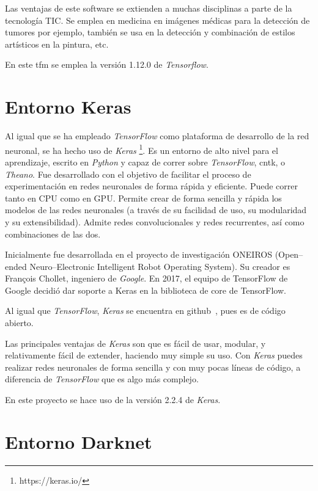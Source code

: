 Las ventajas de este software se extienden a muchas disciplinas a parte de la tecnología TIC. Se emplea en medicina en imágenes médicas para la detección de tumores por ejemplo, también se usa en la detección y combinación de estilos artísticos en la pintura, etc.

En este \acrshort{tfm} se emplea la versión 1.12.0 de \textit{Tensorflow}.

\section{Entorno Keras}

Al igual que se ha empleado \textit{TensorFlow} como plataforma de desarrollo de la red neuronal, se ha hecho uso de \textit{Keras} \footnote{https://keras.io/}. Es un entorno de alto nivel para el aprendizaje, escrito en \textit{Python} y capaz de correr sobre \textit{TensorFlow}, \acrshort{cntk}, o \textit{Theano}. Fue desarrollado con el objetivo de facilitar el proceso de experimentación en redes neuronales de forma rápida y eficiente. Puede correr tanto en CPU como en GPU. Permite crear de forma sencilla y rápida los modelos de las redes neuronales (a través de su facilidad de uso, su modularidad y su extensibilidad). Admite redes convolucionales y redes recurrentes, así como combinaciones de las dos.

Inicialmente fue desarrollada en el proyecto de investigación ONEIROS (Open--ended Neuro--Electronic Intelligent Robot Operating System). Su creador es Fran\c{c}ois Chollet, ingeniero de \textit{Google}.
En 2017, el equipo de TensorFlow de Google decidió dar soporte a Keras en la biblioteca de core de TensorFlow.

Al igual que \textit{TensorFlow}, \textit{Keras} se encuentra en github~\cite{keras_github}, pues es de código abierto. 

Las principales ventajas de \textit{Keras} son que es fácil de usar, modular, y relativamente fácil de extender, haciendo muy simple su uso. Con \textit{Keras} puedes realizar redes neuronales de forma sencilla y con muy pocas líneas de código, a diferencia de \textit{TensorFlow} que es algo más complejo. 

En este proyecto se hace uso de la versión 2.2.4 de \textit{Keras}.


\section{Entorno Darknet}

